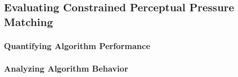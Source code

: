 
\subsection{Evaluating Constrained Perceptual Pressure Matching}
\label{ch:results:results:constrained_results}

\subsubsection*{Quantifying Algorithm Performance}


\subsubsection*{Analyzing Algorithm Behavior}

